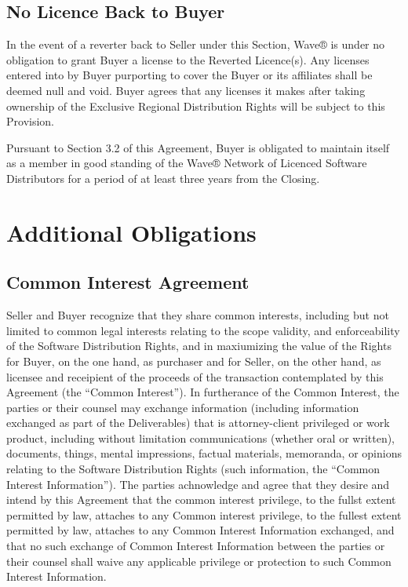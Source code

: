\documentclass[letterpaper,10pt,english]{sphinxmanual}
\begin{document}
\subsection{No Licence Back to Buyer}
\label{\detokenize{4-reversionary:no-licence-back-to-buyer}}
In the event of a reverter back to Seller under this Section,  Wave® is under no obligation to grant Buyer a license to the Reverted Licence(s). Any licenses entered into by Buyer purporting to cover the Buyer or its affiliates shall be deemed null and void. Buyer agrees that any licenses it makes after taking ownership of the Exclusive Regional Distribution Rights will be subject to this Provision.

Pursuant to Section 3.2 of this Agreement, Buyer is obligated to maintain itself as a member in good standing of the Wave® Network of Licenced Software Distributors for a period of at least three years from the Closing.


\section{Additional Obligations}
\label{\detokenize{5-additionalobligations:additional-obligations}}\label{\detokenize{5-additionalobligations::doc}}

\subsection{Common Interest Agreement}
\label{\detokenize{5-additionalobligations:common-interest-agreement}}
Seller and Buyer recognize that they share common interests, including but not limited to common legal interests relating to the scope validity, and enforceability of the Software Distribution Rights, and in maxiumizing the value of the Rights for Buyer, on the one hand, as purchaser and for Seller, on the other hand, as licensee and receipient of the proceeds of the transaction contemplated by this Agreement (the “Common Interest”). In furtherance of the Common Interest, the parties or their counsel may exchange information (including information exchanged as part of the Deliverables) that is attorney-client privileged or work product, including without limitation communications (whether oral or written), documents, things, mental impressions, factual materials, memoranda, or opinions relating to the Software Distribution Rights (such information, the “Common Interest Information”). The parties achnowledge and agree that they desire and intend by this Agreement that the common interest privilege, to the fullst extent permitted by law, attaches to any Common interest privilege, to the fullest extent permitted by law, attaches to any Common Interest Information exchanged, and that no such exchange of Common Interest Information between the parties or their counsel shall waive any applicable privilege or protection to such Common Interest Information.
\end{document}
